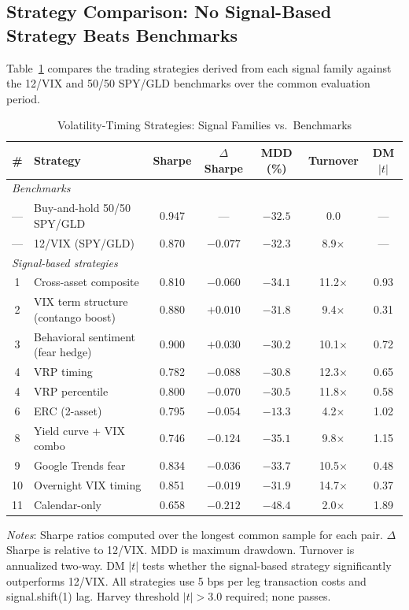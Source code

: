 \documentclass[12pt,a4paper]{article}
\begin{document}
\subsection{Strategy Comparison: No Signal-Based Strategy Beats Benchmarks}

Table~\ref{tab:strategy_results} compares the trading strategies derived from each signal family against the 12/VIX and 50/50 SPY/GLD benchmarks over the common evaluation period.

\begin{table}[H]
\centering
\small
\begin{threeparttable}
\caption{Volatility-Timing Strategies: Signal Families vs.\ Benchmarks}
\label{tab:strategy_results}
\begin{tabular}{@{}clccccc@{}}
\toprule
\# & Strategy & Sharpe & $\Delta$Sharpe & MDD (\%) & Turnover & DM $|t|$ \\
\midrule
\multicolumn{7}{l}{\textit{Benchmarks}} \\
--- & Buy-and-hold 50/50 SPY/GLD & 0.947 & --- & $-32.5$ & 0.0 & --- \\
--- & 12/VIX (SPY/GLD) & 0.870 & $-0.077$ & $-32.3$ & 8.9$\times$ & --- \\
\midrule
\multicolumn{7}{l}{\textit{Signal-based strategies}} \\
1 & Cross-asset composite & 0.810 & $-0.060$ & $-34.1$ & 11.2$\times$ & 0.93 \\
2 & VIX term structure (contango boost) & 0.880 & $+0.010$ & $-31.8$ & 9.4$\times$ & 0.31 \\
3 & Behavioral sentiment (fear hedge) & 0.900 & $+0.030$ & $-30.2$ & 10.1$\times$ & 0.72 \\
4 & VRP timing & 0.782 & $-0.088$ & $-30.8$ & 12.3$\times$ & 0.65 \\
4 & VRP percentile & 0.800 & $-0.070$ & $-30.5$ & 11.8$\times$ & 0.58 \\
6 & ERC (2-asset) & 0.795 & $-0.054$ & $-13.3$ & 4.2$\times$ & 1.02 \\
8 & Yield curve + VIX combo & 0.746 & $-0.124$ & $-35.1$ & 9.8$\times$ & 1.15 \\
9 & Google Trends fear & 0.834 & $-0.036$ & $-33.7$ & 10.5$\times$ & 0.48 \\
10 & Overnight VIX timing & 0.851 & $-0.019$ & $-31.9$ & 14.7$\times$ & 0.37 \\
11 & Calendar-only & 0.658 & $-0.212$ & $-48.4$ & 2.0$\times$ & 1.89 \\
\bottomrule
\end{tabular}
\begin{tablenotes}
\small
\item \textit{Notes}: Sharpe ratios computed over the longest common sample for each pair. $\Delta$Sharpe is relative to 12/VIX. MDD is maximum drawdown. Turnover is annualized two-way. DM $|t|$ tests whether the signal-based strategy significantly outperforms 12/VIX. All strategies use 5 bps per leg transaction costs and signal.shift(1) lag. Harvey threshold $|t|>3.0$ required; none passes.
\end{tablenotes}
\end{threeparttable}
\end{table}
\end{document}
